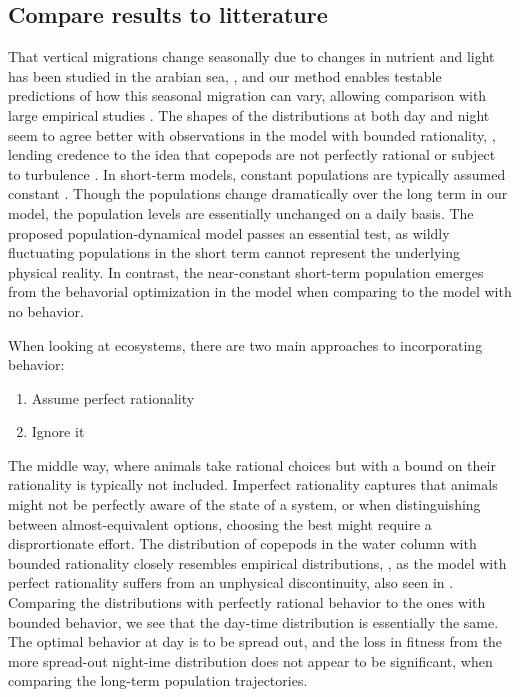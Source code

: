 \subsection{Compare results to litterature} %
That vertical migrations change seasonally due to changes in nutrient and light has been studied in the arabian sea, \citep{wang2014seasonal}, and our method enables testable predictions of how this seasonal migration can vary, allowing comparison with large empirical studies \citep{klevjer2016large}.
The shapes of the distributions at both day and night seem to agree better with observations in the model with bounded rationality, \citep{hay1991zooplankton}, lending credence to the idea that copepods are not perfectly rational or subject to turbulence \citep{visser2001observations}.
In short-term models, constant populations are typically assumed constant \citep{...,...,...}. Though the populations change dramatically over the long term in our model, the population levels are essentially unchanged on a daily basis. The proposed population-dynamical model passes an essential test, as wildly fluctuating populations in the short term cannot represent the underlying physical reality. In contrast, the near-constant short-term population emerges from the behavorial optimization in the model when comparing to the model with no behavior.

When looking at ecosystems, there are two main approaches to incorporating behavior:
\begin{enumerate}
  \item Assume perfect rationality
  \item Ignore it
\end{enumerate}
The middle way, where animals take rational choices but with a bound on their rationality is typically not included. Imperfect rationality captures that animals might not be perfectly aware of the state of a system, or when distinguishing between almost-equivalent options, choosing the best might require a disprortionate effort. The distribution of copepods in the water column with bounded rationality closely resembles empirical distributions, \citep{thomasetal}, as the model with perfect rationality suffers from an unphysical discontinuity, also seen in \citep{uhth}. Comparing the distributions with perfectly rational behavior to the ones with bounded behavior, we see that the day-time distribution is essentially the same. The optimal behavior at day is to be spread out, and the loss in fitness from the more spread-out night-ime distribution does not appear to be significant, when comparing the long-term population trajectories.

